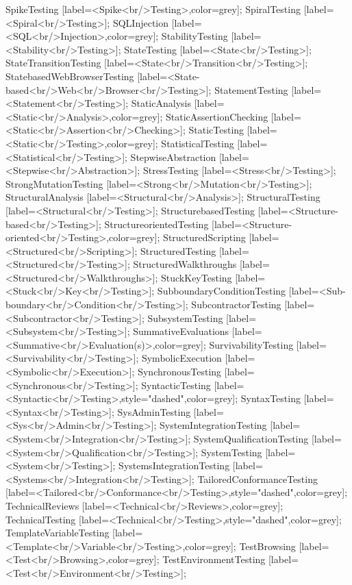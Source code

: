 \documentclass{article}
\begin{document}
{SpikeTesting [label=<Spike<br/>Testing>,color=grey];
SpiralTesting [label=<Spiral<br/>Testing>];
SQLInjection [label=<SQL<br/>Injection>,color=grey];
StabilityTesting [label=<Stability<br/>Testing>];
StateTesting [label=<State<br/>Testing>];
StateTransitionTesting [label=<State<br/>Transition<br/>Testing>];
StatebasedWebBrowserTesting [label=<State-based<br/>Web<br/>Browser<br/>Testing>];
StatementTesting [label=<Statement<br/>Testing>];
StaticAnalysis [label=<Static<br/>Analysis>,color=grey];
StaticAssertionChecking [label=<Static<br/>Assertion<br/>Checking>];
StaticTesting [label=<Static<br/>Testing>,color=grey];
StatisticalTesting [label=<Statistical<br/>Testing>];
StepwiseAbstraction [label=<Stepwise<br/>Abstraction>];
StressTesting [label=<Stress<br/>Testing>];
StrongMutationTesting [label=<Strong<br/>Mutation<br/>Testing>];
StructuralAnalysis [label=<Structural<br/>Analysis>];
StructuralTesting [label=<Structural<br/>Testing>];
StructurebasedTesting [label=<Structure-based<br/>Testing>];
StructureorientedTesting [label=<Structure-oriented<br/>Testing>,color=grey];
StructuredScripting [label=<Structured<br/>Scripting>];
StructuredTesting [label=<Structured<br/>Testing>];
StructuredWalkthroughs [label=<Structured<br/>Walkthroughs>];
StuckKeyTesting [label=<Stuck<br/>Key<br/>Testing>];
SubboundaryConditionTesting [label=<Sub-boundary<br/>Condition<br/>Testing>];
SubcontractorTesting [label=<Subcontractor<br/>Testing>];
SubsystemTesting [label=<Subsystem<br/>Testing>];
SummativeEvaluations [label=<Summative<br/>Evaluation(s)>,color=grey];
SurvivabilityTesting [label=<Survivability<br/>Testing>];
SymbolicExecution [label=<Symbolic<br/>Execution>];
SynchronousTesting [label=<Synchronous<br/>Testing>];
SyntacticTesting [label=<Syntactic<br/>Testing>,style="dashed",color=grey];
SyntaxTesting [label=<Syntax<br/>Testing>];
SysAdminTesting [label=<Sys<br/>Admin<br/>Testing>];
SystemIntegrationTesting [label=<System<br/>Integration<br/>Testing>];
SystemQualificationTesting [label=<System<br/>Qualification<br/>Testing>];
SystemTesting [label=<System<br/>Testing>];
SystemsIntegrationTesting [label=<Systems<br/>Integration<br/>Testing>];
TailoredConformanceTesting [label=<Tailored<br/>Conformance<br/>Testing>,style="dashed",color=grey];
TechnicalReviews [label=<Technical<br/>Reviews>,color=grey];
TechnicalTesting [label=<Technical<br/>Testing>,style="dashed",color=grey];
TemplateVariableTesting [label=<Template<br/>Variable<br/>Testing>,color=grey];
TestBrowsing [label=<Test<br/>Browsing>,color=grey];
TestEnvironmentTesting [label=<Test<br/>Environment<br/>Testing>];
}
\end{document}
